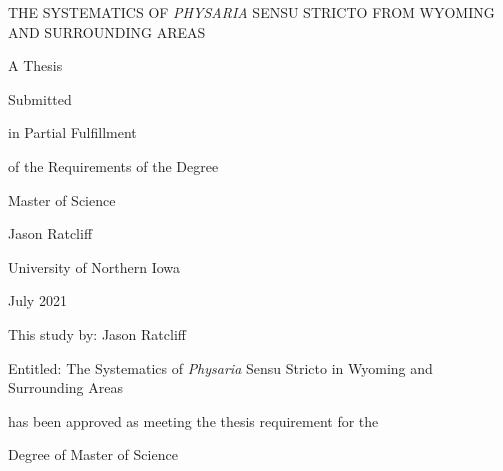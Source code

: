 \clearpage

\clearpage
\thispagestyle{empty}
\begin{center} 
THE SYSTEMATICS OF \textit{PHYSARIA} SENSU STRICTO FROM WYOMING 
AND SURROUNDING AREAS
\end{center}
\vspace{120pt}
\begin{center}
  A Thesis

  Submitted

  in Partial Fulfillment

  of the Requirements of the Degree
  
  Master of Science
\end{center}
\vspace{120pt}
\begin{center}
  Jason Ratcliff
  
  University of Northern Iowa
  
  July 2021
\end{center}

\clearpage
\pagestyle{contents}  %
\setcounter{page}{2}  %

This study by: Jason Ratcliff

Entitled: The Systematics of \textit{Physaria} Sensu Stricto in Wyoming and
Surrounding Areas

\vspace*{24pt}

has been approved as meeting the thesis requirement for the

Degree of Master of Science

\vspace*{24pt}

\singlespacing

